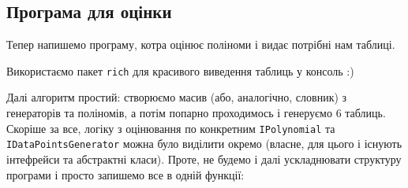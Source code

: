 \documentclass[12pt]{extarticle}
\begin{document}
\subsection{Програма для оцінки}

Тепер напишемо програму, котра оцінює поліноми і видає потрібні нам таблиці. 

Використаємо пакет \texttt{rich} для красивого виведення таблиць у консоль :)

Далі алгоритм простий: створюємо масив (або, аналогічно, словник) з генераторів та поліномів, а потім попарно проходимось і генеруємо $6$ таблиць. Скоріше за все, логіку з оцінювання по конкретним \texttt{IPolynomial} та \texttt{IDataPointsGenerator} можна було виділити окремо (власне, для цього і існують інтефрейси та абстрактні класи). Проте, не будемо і далі ускладнювати структуру програми і просто запишемо все в одній функції:
\end{document}

